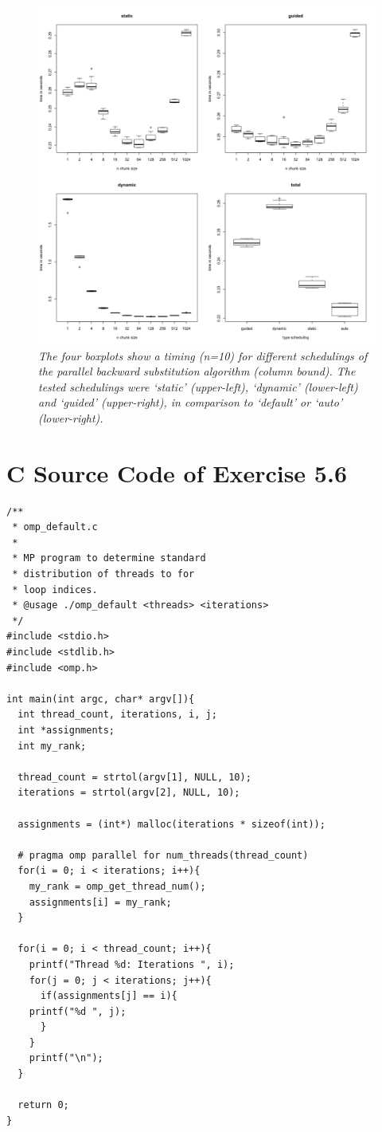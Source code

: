 \documentclass[a4paper,11pt,twoside]{article}
\begin{document}
\begin{figure}
  \centering
  \includegraphics[width=1\textwidth]{scheduling.png}
  \caption{\textit{The four boxplots show a timing (n=10) for different schedulings of the parallel backward substitution algorithm (column bound). The tested schedulings were `static' (upper-left), `dynamic' (lower-left) and  `guided' (upper-right), in comparison to `default' or `auto' (lower-right). }}
  \label{fig:scheduling}
\end{figure}

\appendix

\section{C Source Code of Exercise 5.6}{\label{app:default}}
\begin{verbatim}
/**
 * omp_default.c
 * 
 * MP program to determine standard 
 * distribution of threads to for
 * loop indices.
 * @usage ./omp_default <threads> <iterations> 
 */
#include <stdio.h>
#include <stdlib.h>
#include <omp.h>

int main(int argc, char* argv[]){
  int thread_count, iterations, i, j;
  int *assignments;
  int my_rank;

  thread_count = strtol(argv[1], NULL, 10);
  iterations = strtol(argv[2], NULL, 10);

  assignments = (int*) malloc(iterations * sizeof(int));

  # pragma omp parallel for num_threads(thread_count)
  for(i = 0; i < iterations; i++){
    my_rank = omp_get_thread_num();
    assignments[i] = my_rank;
  }

  for(i = 0; i < thread_count; i++){
    printf("Thread %d: Iterations ", i);
    for(j = 0; j < iterations; j++){
      if(assignments[j] == i){
	printf("%d ", j);
      }
    }
    printf("\n");
  }

  return 0;
}

\end{verbatim}
\end{document}
